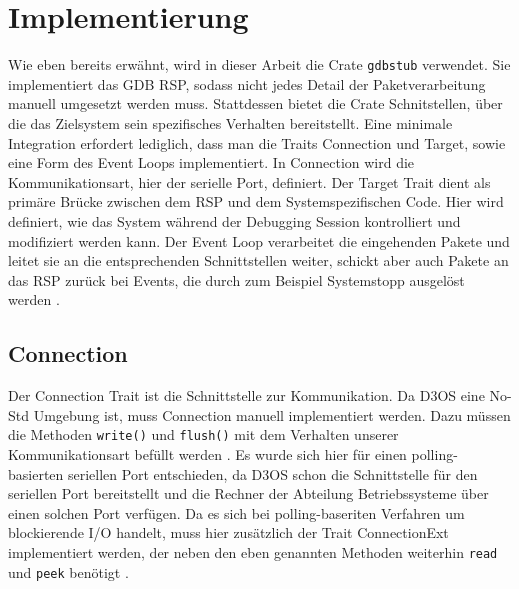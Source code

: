 \chapter{Implementierung}
Wie eben bereits erwähnt, wird in dieser Arbeit die Crate \texttt{gdbstub} verwendet. Sie implementiert das GDB RSP, sodass nicht jedes Detail der Paketverarbeitung manuell umgesetzt werden muss. Stattdessen bietet die Crate Schnitstellen, über die das Zielsystem sein spezifisches Verhalten bereitstellt. Eine minimale Integration erfordert lediglich, dass man die Traits Connection und Target, sowie eine Form des Event Loops implementiert. In Connection wird die Kommunikationsart, hier der serielle Port, definiert. Der Target Trait dient als primäre Brücke zwischen dem RSP und dem Systemspezifischen Code. Hier wird definiert, wie das System während der Debugging Session kontrolliert und modifiziert werden kann. Der Event Loop verarbeitet die eingehenden Pakete und leitet sie an die entsprechenden Schnittstellen weiter, schickt aber auch Pakete an das RSP zurück bei Events, die durch zum Beispiel Systemstopp ausgelöst werden \cite{gdbstub}.

\section{Connection}
Der Connection Trait ist die Schnittstelle zur Kommunikation. Da D3OS eine No-Std Umgebung ist, muss Connection manuell implementiert werden. Dazu müssen die Methoden \texttt{write()} und \texttt{flush()} mit dem Verhalten unserer Kommunikationsart befüllt werden \cite{gdbstub}. Es wurde sich hier für einen polling-basierten seriellen Port entschieden, da D3OS schon die Schnittstelle für den seriellen Port bereitstellt und die Rechner der Abteilung Betriebssysteme über einen solchen Port verfügen. Da es sich bei polling-baseriten Verfahren um blockierende I/O handelt, muss hier zusätzlich der Trait ConnectionExt implementiert werden, der neben den eben genannten Methoden weiterhin \texttt{read} und \texttt{peek} benötigt \cite{gdbstub}.

